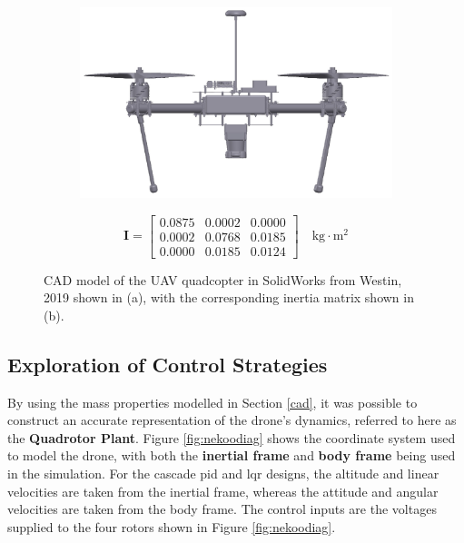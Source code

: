 \begin{figure}[H]
    \centering
    \begin{subfigure}[b]{0.5\textwidth} %
        \centering
        \includegraphics[width=\textwidth]{figs/Samuel/Figures/drone_new2 (cropped) (pdfresizer.com).pdf}
        \caption{}
        \label{fig:2a}
    \end{subfigure}
    \hspace{0.01\textwidth}
    \begin{subfigure}[b]{0.3\textwidth} %
        \centering
        \begin{equation*}
            \mathbf{I} =
            \begin{bmatrix}
                0.0875& 0.0002 & 0.0000 \\
                0.0002 & 0.0768 & 0.0185 \\
               0.0000 & 0.0185 & 0.0124
            \end{bmatrix} \quad \text{kg} \cdot \text{m}^2
        \end{equation*}
        \caption{}
        \label{fig:2b}
    \end{subfigure}
    \caption{CAD model of the UAV quadcopter in SolidWorks from Westin, 2019 \cite{westin2019x4} shown in (a), with the corresponding inertia matrix shown in (b).}
    \label{fig:dronecad}
\end{figure}


\subsection{Exploration of Control Strategies}

By using the mass properties modelled in Section \ref{cad}, it was possible to construct an accurate representation of the drone's dynamics, referred to here as the \textbf{Quadrotor Plant}. Figure \ref{fig:nekoodiag} shows the coordinate system used to model the drone, with both the \textbf{inertial frame} and \textbf{body frame} being used in the simulation. For the cascade \gls{pid} and \gls{lqr} designs, the altitude and linear velocities are taken from the inertial frame, whereas the attitude and angular velocities are taken from the body frame. The control inputs are the voltages supplied to the four rotors shown in Figure \ref{fig:nekoodiag}.


